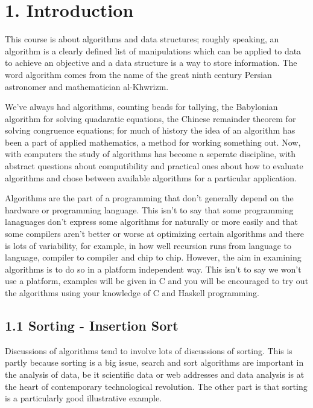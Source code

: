 \documentclass[11pt,a4paper]{scrartcl}
\begin{document}
\section*{1. Introduction}

This course is about algorithms and data structures; roughly speaking,
an algorithm is a clearly defined list of manipulations which can be
applied to data to achieve an objective and a data structure is a way
to store information. The word algorithm comes from the name of the
great ninth century Persian astronomer and mathematician
al-Khwrizm. 

We've always had algorithms, counting beads for tallying, the
Babylonian algorithm for solving quadaratic equations, the Chinese
remainder theorem for solving congruence equations; for much of
history the idea of an algorithm has been a part of applied
mathematics, a method for working something out. Now, with computers
the study of algorithms has become a seperate discipline, with
abstract questions about computibility and practical ones about how to
evaluate algorithms and chose between available algorithms for a
particular application.

Algorithms are the part of a programming that don't generally depend
on the hardware or programming language. This isn't to say that some
programming lanaguages don't express some algorithms for naturally or
more easily and that some compilers aren't better or worse at
optimizing certain algorithms and there is lots of variability, for
example, in how well recursion runs from language to language,
compiler to compiler and chip to chip. However, the aim in examining
algorithms is to do so in a platform independent way. This isn't to
say we won't use a platform, examples will be given in C and you will
be encouraged to try out the algorithms using your knowledge of C and
Haskell programming.

\subsection*{1.1 Sorting - Insertion Sort}

Discussions of algorithms tend to involve lots of discussions of
sorting. This is partly because sorting is a big issue, search and
sort algorithms are important in the analysis of data, be it
scientific data or web addresses and data analysis is at the heart of
contemporary technological revolution. The other part is that sorting
is a particularly good illustrative example.
\end{document}
